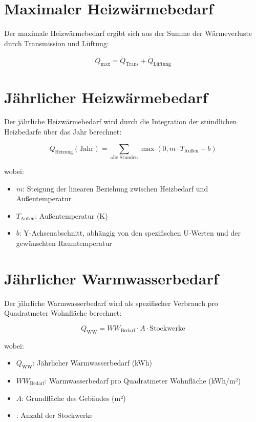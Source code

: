\section{Maximaler Heizwärmebedarf}

Der maximale Heizwärmebedarf ergibt sich aus der Summe der Wärmeverluste durch Transmission und Lüftung:

\begin{equation}
Q_\text{max} = \dot{Q}_\text{Trans} + \dot{Q}_\text{Lüftung}
\end{equation}

\section{Jährlicher Heizwärmebedarf}

Der jährliche Heizwärmebedarf wird durch die Integration der stündlichen Heizbedarfe über das Jahr berechnet:

\begin{equation}
Q_\text{Heizung}(\text{Jahr}) = \sum_{\text{alle Stunden}} \max\left(0, m \cdot T_\text{Außen} + b\right)
\end{equation}

\noindent
wobei:
\begin{itemize}
    \item \(m\): Steigung der linearen Beziehung zwischen Heizbedarf und Außentemperatur
    \item \(T_\text{Außen}\): Außentemperatur (K)
    \item \(b\): Y-Achsenabschnitt, abhängig von den spezifischen U-Werten und der gewünschten Raumtemperatur
\end{itemize}

\section{Jährlicher Warmwasserbedarf}

Der jährliche Warmwasserbedarf wird als spezifischer Verbrauch pro Quadratmeter Wohnfläche berechnet:

\begin{equation}
Q_\text{WW} = WW_\text{Bedarf} \cdot A \cdot \text{Stockwerke}
\end{equation}

\noindent
wobei:
\begin{itemize}
    \item \(Q_\text{WW}\): Jährlicher Warmwasserbedarf (kWh)
    \item \(WW_\text{Bedarf}\): Warmwasserbedarf pro Quadratmeter Wohnfläche (kWh/m²)
    \item \(A\): Grundfläche des Gebäudes (m²)
    \item {}: Anzahl der Stockwerke
\end{itemize}

